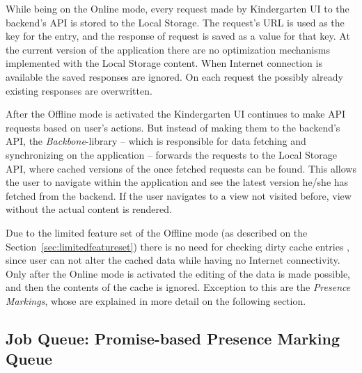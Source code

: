While being on the Online mode, every request made by Kindergarten UI to the backend's API is stored to the Local Storage. The request's URL is used as the key for the entry, and the response of request is saved as a value for that key. At the current version of the application there are no optimization mechanisms implemented with the Local Storage content. When Internet connection is available the saved responses are ignored. On each request the possibly already existing responses are overwritten.

After the Offline mode is activated the Kindergarten UI continues to make API requests based on user's actions. But instead of making them to the backend's API, the \textit{Backbone}-library -- which is responsible for data fetching and synchronizing on the application -- forwards the requests to the Local Storage API, where cached versions of the once fetched requests can be found. This allows the user to navigate within the application and see the latest version he/she has fetched from the backend. If the user navigates to a view not visited before, view without the actual content is rendered. 

Due to the limited feature set of the Offline mode (as described on the Section~\ref{sec:limitedfeatureset}) there is no need for checking dirty cache entries \cite[Page 138]{laplante_dictionary_2000}, since user can not alter the cached data while having no Internet connectivity. Only after the Online mode is activated the editing of the data is made possible, and then the contents of the cache is ignored. Exception to this are the \textit{Presence Markings}, whose are explained in more detail on the following section.










\subsection{Job Queue: Promise-based Presence Marking Queue}
\label{subsec:jobqueue}

